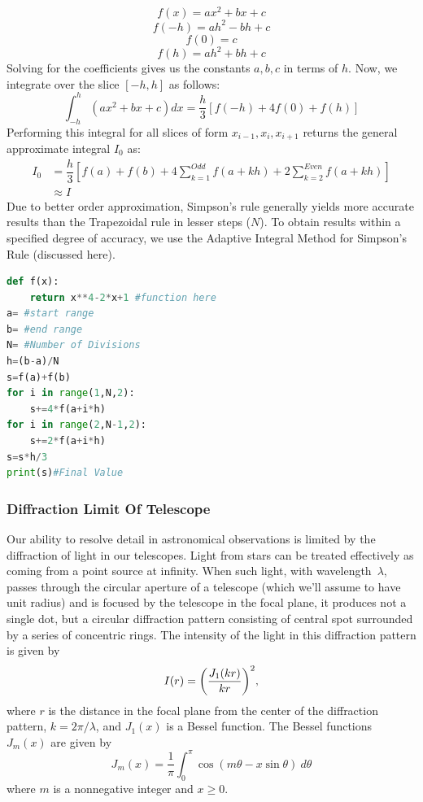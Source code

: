 \[	f(x)=ax^{2}+bx+c\]
\[	f(-h)=ah^{2}-bh+c\]
\[	f(0)=c\]
\[	f(h)=ah^{2}+bh+c\]
Solving for the coefficients gives us the constants $a,b,c$ in terms of $h$. Now, we integrate over the slice $[-h,h]$ as follows:
\[\int_{-h}^{h}(ax^{2}+bx+c)dx=\dfrac{h}{3}[f(-h)+4f(0)+f(h)]  \]
Performing this integral for all slices of form $x_{i-1},x_{i},x_{i+1}$ returns the general approximate integral $I_{0}$ as:
\[\begin{split}
I_{0}&=\dfrac{h}{3}[f(a)+f(b)+4\sum_{k=1}^{Odd}f(a+kh)+2\sum_{k=2}^{Even}f(a+kh)]\\
&\approx I
\end{split}\]
Due to better order approximation, Simpson's rule generally yields more accurate results than the Trapezoidal rule in lesser steps ($N$). To obtain results within a specified degree of accuracy, we use the Adaptive Integral Method for Simpson's Rule (discussed here).
\begin{lstlisting}[language=Python, caption=Simpson's Rule, frame=single, label={lst:L4} ]
def f(x):
	return x**4-2*x+1 #function here
a= #start range
b= #end range
N= #Number of Divisions
h=(b-a)/N
s=f(a)+f(b)
for i in range(1,N,2):
	s+=4*f(a+i*h)
for i in range(2,N-1,2):
	s+=2*f(a+i*h)
s=s*h/3 
print(s)#Final Value
\end{lstlisting}
\subsubsection{Diffraction Limit Of Telescope}
Our ability to resolve detail in astronomical observations is
limited by the diffraction of light in our telescopes.  Light from stars
can be treated effectively as coming from a point source at infinity.  When
such light, with wavelength~$\lambda$, passes through the circular aperture
of a telescope (which we'll assume to have unit radius) and is focused by
the telescope in the focal plane, it produces not a single dot, but a
circular diffraction pattern consisting of central spot surrounded by a
series of concentric rings.  The intensity of the light in this diffraction
pattern is given by
\begin{displaymath}
I(r) = \biggl( {J_1(kr)\over kr} \biggr)^2,
\end{displaymath}
where $r$ is the distance in the focal plane from the center of the
diffraction pattern, $k=2\pi/\lambda$, and $J_1(x)$ is a Bessel function.
The Bessel functions~$J_m(x)$ are given by
\begin{displaymath}
J_m(x) = {\dfrac{1}{\pi}} \int_0^\pi \cos(m\theta - x\sin\theta) \ d\theta
\end{displaymath}
where $m$ is a nonnegative integer and $x\ge0$. \\

